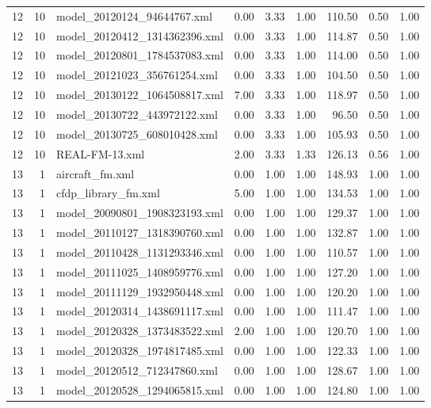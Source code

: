\begin{table}[ht]
\begin{tabular}{rrlrrrrrr}
   12 &  10 & model\_20120124\_94644767.xml & 0.00 & 3.33 & 1.00 & 110.50 & 0.50 & 1.00 \\ 
   12 &  10 & model\_20120412\_1314362396.xml & 0.00 & 3.33 & 1.00 & 114.87 & 0.50 & 1.00 \\ 
   12 &  10 & model\_20120801\_1784537083.xml & 0.00 & 3.33 & 1.00 & 114.00 & 0.50 & 1.00 \\ 
   12 &  10 & model\_20121023\_356761254.xml & 0.00 & 3.33 & 1.00 & 104.50 & 0.50 & 1.00 \\ 
   12 &  10 & model\_20130122\_1064508817.xml & 7.00 & 3.33 & 1.00 & 118.97 & 0.50 & 1.00 \\ 
   12 &  10 & model\_20130722\_443972122.xml & 0.00 & 3.33 & 1.00 & 96.50 & 0.50 & 1.00 \\ 
   12 &  10 & model\_20130725\_608010428.xml & 0.00 & 3.33 & 1.00 & 105.93 & 0.50 & 1.00 \\ 
   12 &  10 & REAL-FM-13.xml & 2.00 & 3.33 & 1.33 & 126.13 & 0.56 & 1.00 \\ 
   13 &   1 & aircraft\_fm.xml & 0.00 & 1.00 & 1.00 & 148.93 & 1.00 & 1.00 \\ 
   13 &   1 & cfdp\_library\_fm.xml & 5.00 & 1.00 & 1.00 & 134.53 & 1.00 & 1.00 \\ 
   13 &   1 & model\_20090801\_1908323193.xml & 0.00 & 1.00 & 1.00 & 129.37 & 1.00 & 1.00 \\ 
   13 &   1 & model\_20110127\_1318390760.xml & 0.00 & 1.00 & 1.00 & 132.87 & 1.00 & 1.00 \\ 
   13 &   1 & model\_20110428\_1131293346.xml & 0.00 & 1.00 & 1.00 & 110.57 & 1.00 & 1.00 \\ 
   13 &   1 & model\_20111025\_1408959776.xml & 0.00 & 1.00 & 1.00 & 127.20 & 1.00 & 1.00 \\ 
   13 &   1 & model\_20111129\_1932950448.xml & 0.00 & 1.00 & 1.00 & 120.20 & 1.00 & 1.00 \\ 
   13 &   1 & model\_20120314\_1438691117.xml & 0.00 & 1.00 & 1.00 & 111.47 & 1.00 & 1.00 \\ 
   13 &   1 & model\_20120328\_1373483522.xml & 2.00 & 1.00 & 1.00 & 120.70 & 1.00 & 1.00 \\ 
   13 &   1 & model\_20120328\_1974817485.xml & 0.00 & 1.00 & 1.00 & 122.33 & 1.00 & 1.00 \\ 
   13 &   1 & model\_20120512\_712347860.xml & 0.00 & 1.00 & 1.00 & 128.67 & 1.00 & 1.00 \\ 
   13 &   1 & model\_20120528\_1294065815.xml & 0.00 & 1.00 & 1.00 & 124.80 & 1.00 & 1.00 \\ 

\end{tabular}
\end{table}
